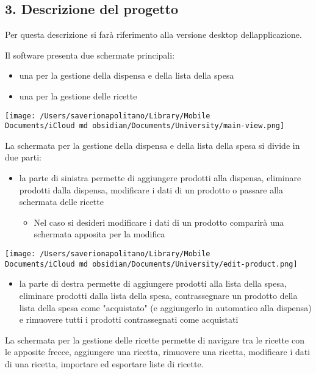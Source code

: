 \documentclass[
]{article}
\providecommand{\tightlist}{%
  \setlength{\itemsep}{0pt}\setlength{\parskip}{0pt}}
\begin{document}
\subsection{3. Descrizione del progetto}\label{descrizione-del-progetto}

Per questa descrizione si farà riferimento alla versione desktop
dell\textquotesingle applicazione.

Il software presenta due schermate principali:

\begin{itemize}
\tightlist
\item
  una per la gestione della dispensa e della lista della spesa
\item
  una per la gestione delle ricette
\end{itemize}

\texttt{[image: /Users/saverionapolitano/Library/Mobile Documents/iCloud~md~obsidian/Documents/University/main-view.png]}

La schermata per la gestione della dispensa e della lista della spesa si
divide in due parti:

\begin{itemize}
\tightlist
\item
  la parte di sinistra permette di aggiungere prodotti alla dispensa,
  eliminare prodotti dalla dispensa, modificare i dati di un prodotto o
  passare alla schermata delle ricette

  \begin{itemize}
  \tightlist
  \item
    Nel caso si desideri modificare i dati di un prodotto comparirà una
    schermata apposita per la modifica
  \end{itemize}
\end{itemize}

\texttt{[image: /Users/saverionapolitano/Library/Mobile Documents/iCloud~md~obsidian/Documents/University/edit-product.png]}

\begin{itemize}
\tightlist
\item
  la parte di destra permette di aggiungere prodotti alla lista della
  spesa, eliminare prodotti dalla lista della spesa, contrassegnare un
  prodotto della lista della spesa come "acquistato" (e aggiungerlo in
  automatico alla dispensa) e rimuovere tutti i prodotti contrassegnati
  come acquistati
\end{itemize}

La schermata per la gestione delle ricette permette di navigare tra le
ricette con le apposite frecce, aggiungere una ricetta, rimuovere una
ricetta, modificare i dati di una ricetta, importare ed esportare liste
di ricette.
\end{document}
